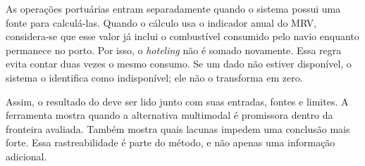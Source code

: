 As operações portuárias entram separadamente quando o sistema possui uma fonte para calculá-las. Quando o cálculo usa o indicador anual do MRV, considera-se que esse valor já inclui o combustível consumido pelo navio enquanto permanece no porto. Por isso, o \emph{hoteling} não é somado novamente. Essa regra evita contar duas vezes o mesmo consumo. Se um dado não estiver disponível, o sistema o identifica como indisponível; ele não o transforma em zero.

Assim, o resultado do \CabotageLens{} deve ser lido junto com suas entradas, fontes e limites. A ferramenta mostra quando a alternativa multimodal é promissora dentro da fronteira avaliada. Também mostra quais lacunas impedem uma conclusão mais forte. Essa rastreabilidade é parte do método, e não apenas uma informação adicional.
